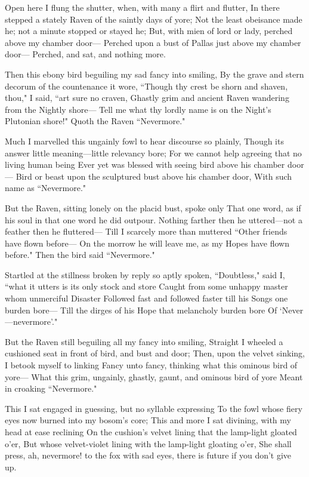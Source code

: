 \documentclass{article}
\begin{document}
Open here I flung the shutter, when, with many a flirt and flutter,
In there stepped a stately Raven of the saintly days of yore;
Not the least obeisance made he; not a minute stopped or stayed he;
But, with mien of lord or lady, perched above my chamber door---
Perched upon a bust of Pallas just above my chamber door---
Perched, and sat, and nothing more.

Then this ebony bird beguiling my sad fancy into smiling,
By the grave and stern decorum of the countenance it wore,
``Though thy crest be shorn and shaven, thou," I said, ``art sure no craven,
Ghastly grim and ancient Raven wandering from the Nightly shore---
Tell me what thy lordly name is on the Night’s Plutonian shore!"
Quoth the Raven ``Nevermore."

Much I marvelled this ungainly fowl to hear discourse so plainly,
Though its answer little meaning---little relevancy bore;
For we cannot help agreeing that no living human being
Ever yet was blessed with seeing bird above his chamber door---
Bird or beast upon the sculptured bust above his chamber door,
With such name as ``Nevermore."

But the Raven, sitting lonely on the placid bust, spoke only
That one word, as if his soul in that one word he did outpour.
Nothing farther then he uttered---not a feather then he fluttered---
Till I scarcely more than muttered ``Other friends have flown before---
On the morrow he will leave me, as my Hopes have flown before."
Then the bird said ``Nevermore."

Startled at the stillness broken by reply so aptly spoken,
``Doubtless," said I, ``what it utters is its only stock and store
Caught from some unhappy master whom unmerciful Disaster
Followed fast and followed faster till his Songs one burden bore---
Till the dirges of his Hope that melancholy burden bore
Of ‘Never---nevermore’."

But the Raven still beguiling all my fancy into smiling,
Straight I wheeled a cushioned seat in front of bird, and bust and door;
Then, upon the velvet sinking, I betook myself to linking
Fancy unto fancy, thinking what this ominous bird of yore---
What this grim, ungainly, ghastly, gaunt, and ominous bird of yore
Meant in croaking ``Nevermore."

This I sat engaged in guessing, but no syllable expressing
To the fowl whose fiery eyes now burned into my bosom’s core;
This and more I sat divining, with my head at ease reclining
On the cushion’s velvet lining that the lamp-light gloated o’er,
But whose velvet-violet lining with the lamp-light gloating o’er,
She shall press, ah, nevermore!
to the fox with sad eyes, there is future if you don't give up.
\end{document}
